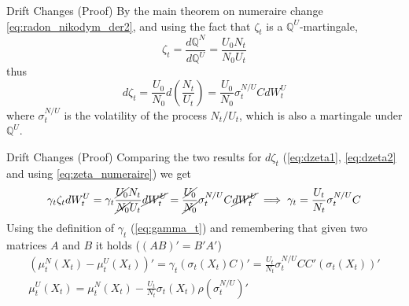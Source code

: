 \documentclass{beamer}
\begin{document}
\begin{frame}{Drift Changes (Proof)}
  By the main theorem on numeraire change \cref{eq:radon_nikodym_der2}, and using the fact that $\zeta_t$ is a $\mathbb{Q}^U$-martingale, 
  \begin{equation}
    \zeta_t = \frac{d\mathbb{Q}^N}{d\mathbb{Q}^U} = \frac{U_0N_t}{N_0U_t}
    \label{eq:zeta_numeraire}
  \end{equation}
  thus
  \begin{equation}
    d\zeta_t= \frac{U_0}{N_0}d\left(\frac{N_t}{U_t}\right)= \frac{U_0}{N_0}\sigma_t^{N/U}CdW_t^U
    \label{eq:dzeta2}
  \end{equation}
  where $\sigma^{N/U}_t$ is the volatility of the process $N_t/U_t$, which is also a martingale under $\mathbb{Q}^U$.
\end{frame}
  
\begin{frame}{Drift Changes (Proof)}
  Comparing the two results for $d\zeta_t$ (\cref{eq:dzeta1}, \cref{eq:dzeta2} and using \cref{eq:zeta_numeraire}) we get
  \begin{equation*}
    \begin{gathered}
      \gamma_t\zeta_tdW_t^U = \gamma_t\frac{\cancel{U_0}N_t}{\cancel{N_0}U_t}\cancel{dW_t^U}=	\frac{\cancel{U_0}}{\cancel{N_0}}\sigma^{N/U}_tC\cancel{dW_t^U} \implies 
      \gamma_t = \frac{U_t}{N_t}\sigma^{N/U}_tC
    \end{gathered}
  \end{equation*}
  \pause
  Using the definition of $\gamma_t$ (\cref{eq:gamma_t}) and remembering that given two matrices $A$ and $B$ it holds ($(AB)' = B'A'$)
  \begin{equation}
    \begin{gathered}
    (\mu_t^N(X_t)-\mu_t^U(X_t))'= \gamma_t (\sigma_t(X_t)C)'=\frac{U_t}{N_t}\sigma^{N/U}_t CC'(\sigma_t(X_t))'\\
    \mu_t^U(X_t)=\mu_t^N(X_t)-\frac{U_t}{N_t}\sigma_t(X_t)\rho(\sigma^{N/U}_t)'
    \end{gathered}
  \label{eq:gamma}
\end{equation}
\end{frame}
\end{document}
